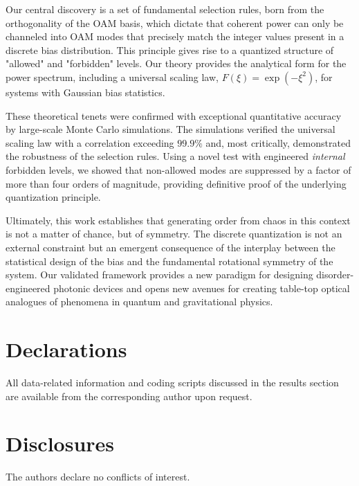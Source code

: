 \documentclass[a4paper,12pt]{article}
\begin{document}
Our central discovery is a set of fundamental selection rules, born from the orthogonality of the OAM basis, 
which dictate that coherent power can only be channeled into OAM modes that precisely match the integer values 
present in a discrete bias distribution. This principle gives rise to a quantized structure of "allowed" 
and "forbidden" levels. Our theory provides the analytical form for the power spectrum, including a universal 
scaling law, $F(\xi) = \exp(-\xi^2)$, for systems with Gaussian bias statistics.

These theoretical tenets were confirmed with exceptional quantitative accuracy by large-scale Monte Carlo 
simulations. The simulations verified the universal scaling law with a correlation exceeding $99.9\%$ and, 
most critically, demonstrated the robustness of the selection rules. Using a novel test with 
engineered \textit{internal} forbidden levels, we showed that non-allowed modes are suppressed by a factor of 
more than four orders of magnitude, providing definitive proof of the underlying quantization principle.

Ultimately, this work establishes that generating order from chaos in this context is not a matter of chance, 
but of symmetry. The discrete quantization is not an external constraint but an emergent consequence of the 
interplay between the statistical design of the bias and the fundamental rotational symmetry of the system. 
Our validated framework provides a new paradigm for designing disorder-engineered photonic devices and opens 
new avenues for creating table-top optical analogues of phenomena in quantum and gravitational physics.


\section*{Declarations}
All data-related information and coding scripts discussed in the results section are available from the 
corresponding author upon request.

\section*{Disclosures}
The authors declare no conflicts of interest.
\end{document}
